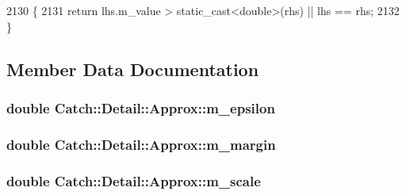 \begin{DoxyCode}
2130                                                                       \{
2131                 \textcolor{keywordflow}{return} lhs.m\_value > \textcolor{keyword}{static\_cast<}\textcolor{keywordtype}{double}\textcolor{keyword}{>}(rhs) || lhs == rhs;
2132             \}
\end{DoxyCode}


\subsection{Member Data Documentation}
\hypertarget{class_catch_1_1_detail_1_1_approx_af17c8e869ae7a55d14b99eb18e178114}{
\subsubsection[{m\-\_\-epsilon}]{\setlength{\rightskip}{0pt plus 5cm}double Catch\-::\-Detail\-::\-Approx\-::m\-\_\-epsilon\hspace{0.3cm}{\ttfamily [private]}}}\label{class_catch_1_1_detail_1_1_approx_af17c8e869ae7a55d14b99eb18e178114}
\hypertarget{class_catch_1_1_detail_1_1_approx_a4262a7e821eec507b424c335121ea0d8}{
\subsubsection[{m\-\_\-margin}]{\setlength{\rightskip}{0pt plus 5cm}double Catch\-::\-Detail\-::\-Approx\-::m\-\_\-margin\hspace{0.3cm}{\ttfamily [private]}}}\label{class_catch_1_1_detail_1_1_approx_a4262a7e821eec507b424c335121ea0d8}
\hypertarget{class_catch_1_1_detail_1_1_approx_a65e9bdab9113ff3300b45f0a4e048dd7}{
\subsubsection[{m\-\_\-scale}]{\setlength{\rightskip}{0pt plus 5cm}double Catch\-::\-Detail\-::\-Approx\-::m\-\_\-scale\hspace{0.3cm}{\ttfamily [private]}}}\label{class_catch_1_1_detail_1_1_approx_a65e9bdab9113ff3300b45f0a4e048dd7}
